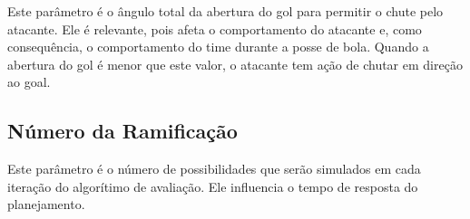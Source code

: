 Este parâmetro é o ângulo total da abertura do gol para permitir o chute pelo
atacante. Ele é relevante, pois afeta o comportamento do atacante e, como
consequência, o comportamento do time durante a posse de bola. Quando a abertura
do gol é menor que este valor, o atacante tem ação de chutar em direção ao goal.


\subsection{Número da Ramificação}

Este parâmetro é o número de possibilidades que serão simulados em cada iteração
do algorítimo de avaliação. Ele influencia o tempo de resposta do planejamento.

